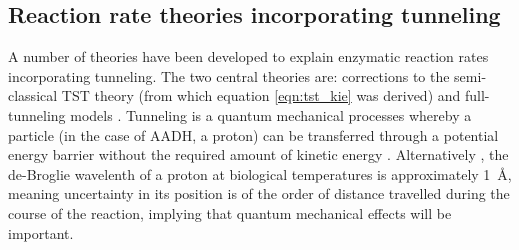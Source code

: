 \subsection{Reaction rate theories incorporating tunneling}

A number of theories have been developed to explain enzymatic reaction rates incorporating tunneling. The two central theories are: corrections to the semi-classical TST theory (from which equation \ref{eqn:tst_kie} was derived) \cite{bellTunnelEffectChemistry1980} and full-tunneling models \cite{kuznetsovProtonHydrogenAtom1999a,  antoniouLargeKineticIsotope1997, antoniouInternalEnzymeMotions2001, knappTemperatureDependentIsotopeEffects2002}. Tunneling is a quantum mechanical processes whereby a particle (in the case of AADH, a proton) can be transferred through a potential energy barrier without the required amount of kinetic energy \cite[chapter 3, 5]{allemannQuantumTunnellingEnzymeCatalysed2004}. Alternatively \cite{chaHydrogenTunnelingEnzyme1989},  the de-Broglie wavelenth of a proton at biological temperatures is approximately \SI{1}{\angstrom}, meaning uncertainty in its position is of the order of distance travelled during the course of the reaction, implying that quantum mechanical effects will be important.  

